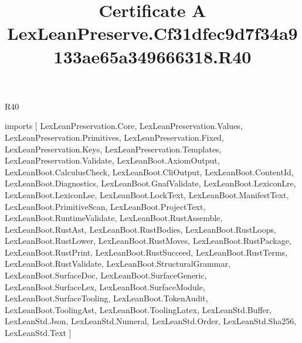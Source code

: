 \begin{lexlean}{R40}
\title{Certificate A LexLeanPreserve.Cf31dfec9d7f34a9133ae65a349666318.R40}
\begin{coremodule}
imports [
  LexLeanPreservation.Core,
  LexLeanPreservation.Values,
  LexLeanPreservation.Primitives,
  LexLeanPreservation.Fixed,
  LexLeanPreservation.Keys,
  LexLeanPreservation.Templates,
  LexLeanPreservation.Validate,
  LexLeanBoot.AxiomOutput,
  LexLeanBoot.CalculusCheck,
  LexLeanBoot.CliOutput,
  LexLeanBoot.ContentId,
  LexLeanBoot.Diagnostics,
  LexLeanBoot.GnafValidate,
  LexLeanBoot.LexiconLre,
  LexLeanBoot.LexiconLse,
  LexLeanBoot.LockText,
  LexLeanBoot.ManifestText,
  LexLeanBoot.PrimitiveScan,
  LexLeanBoot.ProjectText,
  LexLeanBoot.RuntimeValidate,
  LexLeanBoot.RustAssemble,
  LexLeanBoot.RustAst,
  LexLeanBoot.RustBodies,
  LexLeanBoot.RustLoops,
  LexLeanBoot.RustLower,
  LexLeanBoot.RustMoves,
  LexLeanBoot.RustPackage,
  LexLeanBoot.RustPrint,
  LexLeanBoot.RustSucceed,
  LexLeanBoot.RustTerms,
  LexLeanBoot.RustValidate,
  LexLeanBoot.StructuralGrammar,
  LexLeanBoot.SurfaceDoc,
  LexLeanBoot.SurfaceGeneric,
  LexLeanBoot.SurfaceLex,
  LexLeanBoot.SurfaceModule,
  LexLeanBoot.SurfaceTooling,
  LexLeanBoot.TokenAudit,
  LexLeanBoot.ToolingAst,
  LexLeanBoot.ToolingLatex,
  LexLeanStd.Buffer,
  LexLeanStd.Json,
  LexLeanStd.Numeral,
  LexLeanStd.Order,
  LexLeanStd.Sha256,
  LexLeanStd.Text
]


\end{coremodule}
\end{lexlean}
